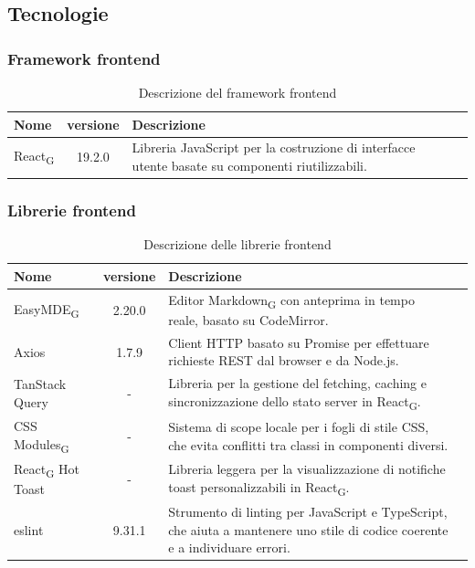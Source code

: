 \documentclass[11pt,a4paper]{article}
\newcommand{\gls}[1]{#1\textsubscript{G}}
\begin{document}
\subsection{Tecnologie}
\subsubsection{Framework frontend}
\begin{table}[H]
    \centering
    \begin{tabular}{|l|c|>{\raggedright\arraybackslash}p{}|p{}|}
        \hline
        \textbf{Nome} & \textbf{versione} & \textbf{Descrizione} \\
        \hline
        \gls{React} & 19.2.0 & Libreria JavaScript per la costruzione di interfacce utente basate su componenti riutilizzabili. \\
        \hline
    \end{tabular}
    \caption{Descrizione del framework frontend}
    \label{tab:framework_frontend}
\end{table}
\subsubsection{Librerie frontend}
    \begin{table}[H]
        \centering
        \begin{tabular}{|l|c|>{\raggedright\arraybackslash}p{}|p{}|}
            \hline
            \textbf{Nome} & \textbf{versione} & \textbf{Descrizione} \\
            \hline
            \gls{EasyMDE} & 2.20.0 & Editor \gls{Markdown} con anteprima in tempo reale, basato su CodeMirror. \\
            \hline
            Axios & 1.7.9 & Client HTTP basato su Promise per effettuare richieste REST dal browser e da Node.js. \\
            \hline
            TanStack Query & - & Libreria per la gestione del fetching, caching e sincronizzazione dello stato server in \gls{React}. \\
            \hline
            \gls{CSS Modules} & - & Sistema di scope locale per i fogli di stile CSS, che evita conflitti tra classi in componenti diversi. \\
            \hline
            \gls{React} Hot Toast & - & Libreria leggera per la visualizzazione di notifiche toast personalizzabili in \gls{React}. \\
            \hline
            eslint & 9.31.1 & Strumento di linting per JavaScript e TypeScript, che aiuta a mantenere uno stile di codice coerente e a individuare errori. \\
            \hline
        \end{tabular}
        \caption{Descrizione delle librerie frontend}
        \label{tab:librerie_frontend}
    \end{table}
\end{document}
